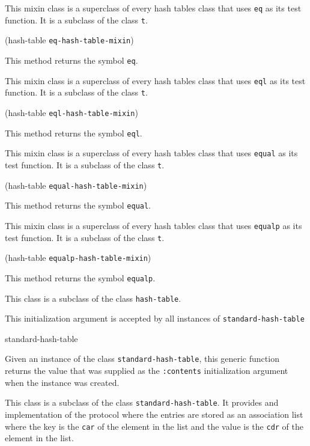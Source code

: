 
This mixin class is a superclass of every hash tables class that uses
\texttt{eq} as its test function.  It is a subclass of the class
\texttt{t}.

{\small{} {(hash-table {\tt eq-hash-table-mixin})}
}

This method returns the symbol \texttt{eq}.


This mixin class is a superclass of every hash tables class that uses
\texttt{eql} as its test function.  It is a subclass of the class
\texttt{t}.

{\small{} {(hash-table {\tt eql-hash-table-mixin})}
}

This method returns the symbol \texttt{eql}.


This mixin class is a superclass of every hash tables class that uses
\texttt{equal} as its test function.  It is a subclass of the class
\texttt{t}.

{\small{} {(hash-table {\tt equal-hash-table-mixin})}
}

This method returns the symbol \texttt{equal}.


This mixin class is a superclass of every hash tables class that uses
\texttt{equalp} as its test function.  It is a subclass of the class
\texttt{t}.

{\small{} {(hash-table {\tt equalp-hash-table-mixin})}
}

This method returns the symbol \texttt{equalp}.


This class is a subclass of the class \texttt{hash-table}.


This initialization argument is accepted by all instances of
\texttt{standard-hash-table}

{\small{} {standard-hash-table}
}

Given an instance of the class \texttt{standard-hash-table}, this
generic function returns the value that was supplied as the
\texttt{:contents} initialization argument when the instance was
created.


This class is a subclass of the class \texttt{standard-hash-table}.
It provides and implementation of the protocol where the entries are
stored as an association list where the key is the \texttt{car} of the
element in the list and the value is the \texttt{cdr} of the element
in the list.
